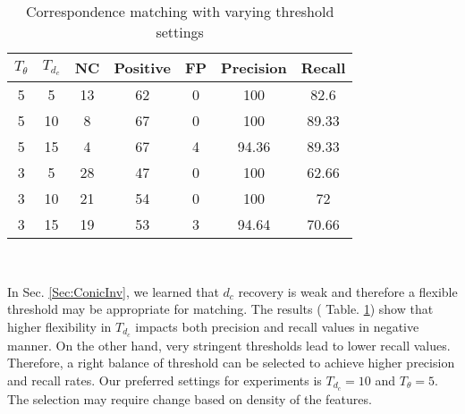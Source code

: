 \documentclass{bmvc2k}
\begin{document}
\begin{table}
\centering
\caption{Correspondence matching with varying threshold settings } \label{table:ThresholdEffect}
\begin{tabular}{ | c | c | c | c | c | c| c |}
\hline
$ T_\theta $ & $ T_{d_c} $ & NC & Positive & FP & Precision & Recall \\ \hline
5 & 5  & 13 & 62 & 0 & 100 & 82.6 \\
5 & 10 & 8 & 67 & 0 & 100 & 89.33\\
5 & 15 & 4 & 67  & 4 & 94.36 & 89.33\\ \hline
3 & 5  & 28 & 47  & 0 & 100 & 62.66 \\
3 & 10 & 21 & 54  & 0 & 100 & 72 \\
3 & 15 & 19 & 53  & 3 & 94.64 & 70.66 \\ \hline
\end{tabular} \\
\label{tab:Exp2}
\end{table}

In Sec. \ref{Sec:ConicInv}, we learned that $ d_c $ recovery is weak and therefore a flexible threshold may be appropriate for matching. 
The results ( Table. \ref{tab:Exp2}) show that higher flexibility in $ T_{d_c} $ impacts both precision and recall values in negative manner. 
On the other hand, very stringent thresholds lead to lower recall values. Therefore, a right balance of threshold can be selected to achieve higher precision and recall rates. Our preferred settings for experiments is $ T_{d_c} = 10 $ and $ T_\theta = 5 $. The selection may require change based on density of the features. 
\end{document}
